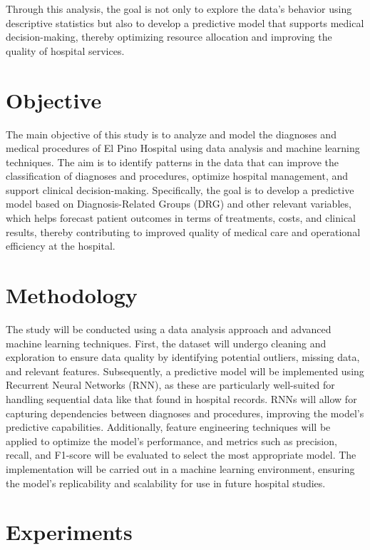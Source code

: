 \documentclass{ieeeaccess}
\begin{document}
Through this analysis, the goal is not only to explore the data's behavior using descriptive statistics but also to develop a predictive model that supports medical decision-making, thereby optimizing resource allocation and improving the quality of hospital services.

\section{Objective}
\label{sec:objective}
The main objective of this study is to analyze and model the diagnoses and medical procedures of El Pino Hospital using data analysis and machine learning techniques. The aim is to identify patterns in the data that can improve the classification of diagnoses and procedures, optimize hospital management, and support clinical decision-making. Specifically, the goal is to develop a predictive model based on Diagnosis-Related Groups (DRG) and other relevant variables, which helps forecast patient outcomes in terms of treatments, costs, and clinical results, thereby contributing to improved quality of medical care and operational efficiency at the hospital.

\section{Methodology}
\label{sec:methodology}
The study will be conducted using a data analysis approach and advanced machine learning techniques. First, the dataset will undergo cleaning and exploration to ensure data quality by identifying potential outliers, missing data, and relevant features. Subsequently, a predictive model will be implemented using Recurrent Neural Networks (RNN), as these are particularly well-suited for handling sequential data like that found in hospital records. RNNs will allow for capturing dependencies between diagnoses and procedures, improving the model's predictive capabilities. Additionally, feature engineering techniques will be applied to optimize the model's performance, and metrics such as precision, recall, and F1-score will be evaluated to select the most appropriate model. The implementation will be carried out in a machine learning environment, ensuring the model's replicability and scalability for use in future hospital studies.

\section{Experiments}
\label{sec:experiments}
\end{document}

